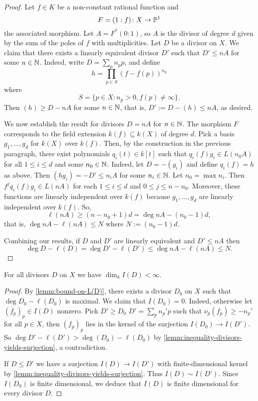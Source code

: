 \begin{proof}
	Let $f \in K$ be a non-constant rational function and 
	\[
		F = (1 : f)\colon X \to \P^{1}
	\]
	the associated morphism. Let $A = F^{*}(0 : 1)$, so $A$ is the divisor of degree $d$ given by the sum of the poles of $f$ with multiplicities. Let $D$ be a divisor on $X$. We claim that there exists a linearly equivalent divisor $D'$ such that $D' \leq nA$ for some $n \in \N$. Indeed, write $D = \sum_{p}n_{p}p$, and define 
	\[
		h = \prod_{p\in S}(f - f(p))^{n_{p}}
	\]
	where
	\[
		S = \{p \in X\colon n_{p} > 0, f(p)\neq \infty\}.
	\]
	Then $(h) \geq D - nA$ for some $n \in \N$, that is, $D' := D - (h) \leq nA$, as desired. 

	We now establish the result for divisors $D = nA$ for $n\in \N$. The morphism $F$ corresponds to the field extension $k(f) \subseteq k(X)$ of degree $d$. Pick a basis $g_{1}, \ldots, g_{d}$ for $k(X)$ over $k(f)$. Then, by the construction in the previous paragraph, there exist polynomials $q_{i}(t) \in k[t]$ such that $q_{i}(f)g_{i} \in L(n_{0}A)$ for all $1 \leq i \leq d$ and some $n_{0}\in \N$. Indeed, let $D = -(g_{i})$ and define $q_{i}(f) = h$ as above. Then $(hg_{i}) = -D' \leq n_{i}A$ for some $n_{i}\in \N$. Let $n_{0} = \max{n_{i}}$. Then $f^{j}q_{i}(f)g_{i} \in L(nA)$ for each $1 \leq i \leq d$ and $0 \leq j \leq n - n_{0}$. Moreover, these functions are linearly independent over $k(f)$ because $g_{1},\ldots,g_{d}$ are linearly independent over $k(f)$. So,
	\[
		\ell(nA) \geq (n - n_{0} + 1)d = \deg nA - (n_{0} - 1)d,
	\]
	that is, $\deg nA - \ell(nA) \leq N$ where $N:= (n_{0} -1)d$. 

	Combining our results, if $D$ and $D'$ are linearly equivalent and $D' \leq nA$ then 
	\[
		\deg D - \ell(D) = \deg D' - \ell(D') \leq \deg nA - \ell(nA) \leq N. 		
	\]
\end{proof}
\begin{theorem}\label{thm:I(D)-is-finite-dimensional}
	For all divisors $D$ on $X$ we have $\dim_{k}I(D) < \infty$.
\end{theorem}
\begin{proof}
	By \cref{lemm:bound-on-L(D)}, there exists a divisor $D_{0}$ on $X$ such that $\deg D_{0} - \ell(D_{0})$ is maximal. We claim that $I(D_{0}) = 0$. Indeed, otherwise let $(\overline{f}_{p})_{p}\in I(D)$ nonzero. Pick $D' \geq D_{0}$  $D '= \sum_{p}n_{p}' p$ such that $\nu_{p}(f_{p}) \geq -n_{p}'$ for all $p\in X$, then $(f_{p})_{p}$ lies in the kernel of the surjection $I(D_{0})\to I(D')$. So $\deg D' - \ell(D') > \deg(D_{0}) - \ell(D_{0})$ by \cref{lemm:inequality-divisors-yields-surjection}, a contradiction. 

	If $D\leq D'$ we have a surjection $I(D) \to I(D')$ with finite-dimensional kernel by \cref{lemm:inequality-divisors-yields-surjection}. Thus $I(D) \sim I(D')$. Since $I(D_{0})$ is finite dimensional, we deduce that $I(D)$ is finite dimensional for every divisor $D$.
\end{proof}

